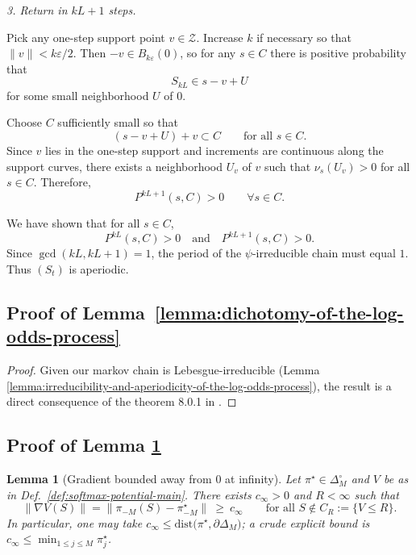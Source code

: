\documentclass[12pt]{article}
\newtheorem{lemma}{Lemma}
\begin{document}
\textit{3. Return in $kL+1$ steps.}

Pick any one-step support point $v\in\mathcal Z$.
Increase $k$ if necessary so that $\|v\|<k\varepsilon/2$.
Then $-v\in B_{k\varepsilon}(0)$, so for any $s\in C$ there is positive probability that
\[
S_{kL} \in s - v + U
\]
for some small neighborhood $U$ of $0$.

Choose $C$ sufficiently small so that
\[
(s - v + U) + v \subset C
\qquad\text{for all } s\in C.
\]
Since $v$ lies in the one-step support and increments are continuous along the
support curves, there exists a neighborhood $U_v$ of $v$ such that
$\nu_s(U_v)>0$ for all $s\in C$.
Therefore,
\[
P^{kL+1}(s,C)>0
\qquad\forall s\in C.
\]

We have shown that for all $s\in C$,
\[
P^{kL}(s,C)>0
\quad\text{and}\quad
P^{kL+1}(s,C)>0.
\]
Since $\gcd(kL,kL+1)=1$, the period of the $\psi$-irreducible chain
must equal $1$. Thus $(S_t)$ is aperiodic.



\subsection{Proof of Lemma~\ref{lemma:dichotomy-of-the-log-odds-process}}


\begin{proof}
    Given our markov chain is Lebesgue-irreducible (Lemma \ref{lemma:irreducibility-and-aperiodicity-of-the-log-odds-process}), the result is a direct consequence of the theorem 8.0.1 in \citet{meynMarkovChainsStochastic1993}.
\end{proof}


    


\subsection{Proof of Lemma \ref{lem:grad-away}}

\begin{lemma}[Gradient bounded away from $0$ at infinity]\label{lem:grad-away}
    Let $\pi^\star\in\Delta_M^\circ$ and $V$ be as in Def.~\ref{def:softmax-potential-main}. There exists $c_\infty>0$ and $R<\infty$ such that
    \[
    \|\nabla V(S)\|=\|\pi_{-M}(S)-\pi^\star_{-M}\|\ \ge\ c_\infty\qquad\text{for all } S\notin C_R:=\{V\le R\}.
    \]
    In particular, one may take $c_\infty\le \mathrm{dist}\big(\pi^\star,\partial\Delta_M\big)$; a crude explicit bound is $c_\infty\le \min_{1\le j\le M}\pi^\star_j$.
    \end{lemma}
    
\end{document}
